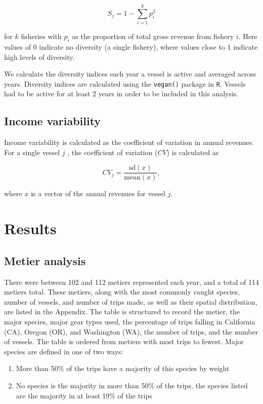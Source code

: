 \documentclass[]{article}
\begin{document}
\[S_j = 1- \sum_{i=1}^k  p_i^2\]

for $k$ fisheries with $p_i$ as the proportion of total gross revenue
from fishery $i$. Here values of 0 indicate no diversity (a single
fishery), where values close to 1 indicate high levels of diversity.

We calculate the diversity indices each year a vessel is active and
averaged across years. Diversity indices are calculated using the
\texttt{vegan()} package in \texttt{R}. Vessels had to be active for at
least 2 years in order to be included in this analysis.

\subsection{Income variability}\label{income-variability}

Income variability is calculated as the coefficient of variation in
annual revenues. For a single vessel $j$ , the coefficient of variation
($CV$) is calculated as

\[CV_j = \frac{\text{sd}(x)}{\text{mean}(x)},\]

where $x$ is a vector of the annual revenues for vessel $j$.

\section{Results}\label{results}

\subsection{Metier analysis}\label{metier-analysis-1}

There were between 102 and 112 metiers represented each year, and a
total of 114 metiers total. These metiers, along with the most commonly
caught species, number of vessels, and number of trips made, as well as
their spatial distribution, are listed in the Appendix. The table is
structured to record the metier, the major species, major gear types
used, the percentage of trips falling in California (CA), Oregon (OR),
and Washington (WA), the number of trips, and the number of vessels. The
table is ordered from metiers with most trips to fewest. Major species
are defined in one of two ways:

\begin{enumerate}
\def\labelenumi{\arabic{enumi}.}
\itemsep1pt\parskip0pt
\item
  More than 50\% of the trips have a majority of this species by weight
\item
  No species is the majority in more than 50\% of the trips, the species
  listed are the majority in at least 19\% of the trips
\end{enumerate}
\end{document}
